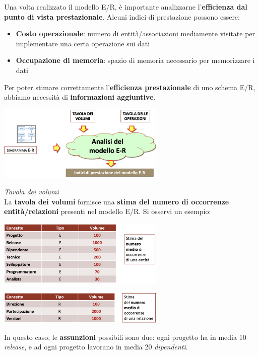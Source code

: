 \documentclass{article}
\begin{document}
Una volta realizzato il modello E/R, è importante analizzarne l'\textbf{efficienza dal punto di vista prestazionale}. Alcuni indici di prestazione possono essere:
\begin{itemize}[label={-}, leftmargin=1cm]
    \item \textbf{Costo operazionale}: numero di entità/associazioni mediamente visitate per implementare una certa operazione sui dati
    \item \textbf{Occupazione di memoria}: spazio di memoria necessario per memorizzare i dati
\end{itemize}
Per poter stimare correttamente l'\textbf{efficienza prestazionale} di uno schema E/R, abbiamo necessità di \textbf{informazioni aggiuntive}.
\begin{center}
    \includegraphics[width=0.6\textwidth]{foto 8.png}
\end{center}
\textit{Tavola dei volumi}\\
La \textbf{tavola dei volumi} fornisce una \textbf{stima del numero di occorrenze entità/relazioni} presenti nel modello E/R. Si osservi un esempio:
\begin{center}
    \includegraphics[width=0.6\textwidth]{foto 9.png}
\end{center}
\begin{center}
    \includegraphics[width=0.6\textwidth]{foto 10.png}
\end{center}
In questo caso, le \textbf{assunzioni} possibili sono due: ogni progetto ha in media 10 \textit{release}, e ad ogni progetto lavorano in media 20 \textit{dipendenti}.\vspace*{14pt}\\
\end{document}
